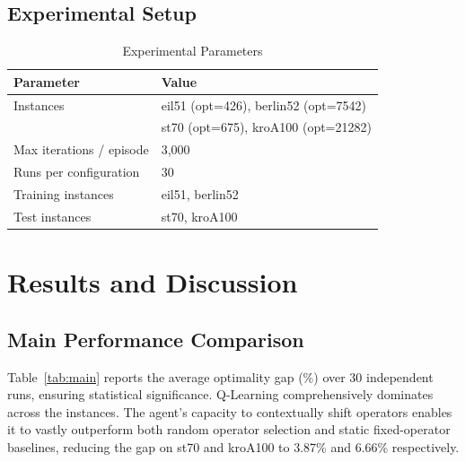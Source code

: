 \documentclass[10pt,twocolumn]{article}
\begin{document}
\subsection{Experimental Setup}

\begin{table}[!htbp]
\centering
\caption{Experimental Parameters}
\small
\begin{tabular}{ll}
\toprule
\textbf{Parameter} & \textbf{Value} \\
\midrule
Instances & eil51 (opt=426), berlin52 (opt=7542) \\
          & st70 (opt=675), kroA100 (opt=21282) \\
Max iterations / episode & 3,000 \\
Runs per configuration & 30 \\
Training instances & eil51, berlin52 \\
Test instances & st70, kroA100 \\
\bottomrule
\end{tabular}
\end{table}

\section{Results and Discussion}

\subsection{Main Performance Comparison}

Table~\ref{tab:main} reports the average optimality gap (\%) over 30 independent runs,
ensuring statistical significance. Q-Learning comprehensively dominates across the instances. 
The agent's capacity to contextually shift operators enables it to vastly outperform 
both random operator selection and static fixed-operator baselines, reducing the gap on 
st70 and kroA100 to 3.87\% and 6.66\% respectively.
\end{document}
